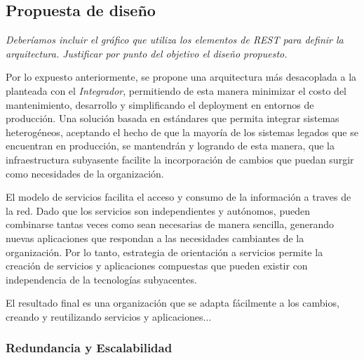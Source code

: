 \subsection{Propuesta de diseño}
\label{propuesta}

\textit{Deberíamos incluir el gráfico que utiliza los elementos de REST para definir la arquitectura. Justificar por punto del objetivo el diseño propuesto.}\\



Por lo expuesto anteriormente, se propone una arquitectura más desacoplada a la planteada con el \textit{Integrador}, permitiendo de esta manera minimizar el costo del mantenimiento, desarrollo y simplificando el deployment en entornos de producción.  Una solución basada en estándares que permita integrar sistemas heterogéneos, aceptando el hecho de que la mayoría de los sistemas legados que se encuentran en producción, se mantendrán y logrando de esta manera, que la infraestructura subyasente facilite la incorporación de cambios que puedan surgir como necesidades de la organización.

El modelo de servicios facilita el acceso y consumo de la información a traves de la red.  Dado que los servicios son independientes y autónomos, pueden combinarse tantas veces como sean necesarias de manera sencilla, generando nuevas aplicaciones que respondan a las necesidades cambiantes de la organización.  Por lo tanto, estrategia de orientación a servicios permite la creación de servicios y aplicaciones compuestas que pueden existir con independencia de la tecnologías subyacentes\cite{microsoft2006}.

El resultado final es una organización que se adapta fácilmente a los cambios, creando y reutilizando servicios y aplicaciones...


\subsubsection{Redundancia y Escalabilidad}


